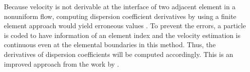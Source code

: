 Because velocity is not derivable at the interface of two adjacent element in a nonuniform flow, computing dispersion coefficient derivatives by using a finite element approach would yield erroneous values \cite{hH02}. To prevent the errors, a particle is coded to have information of an element index and the velocity estimation is continuous even at the elemental boundaries in this method. Thus, the derivatives of dispersion coefficients will be computed accordingly. This is an improved approach from the work by \cite{hH02}.
